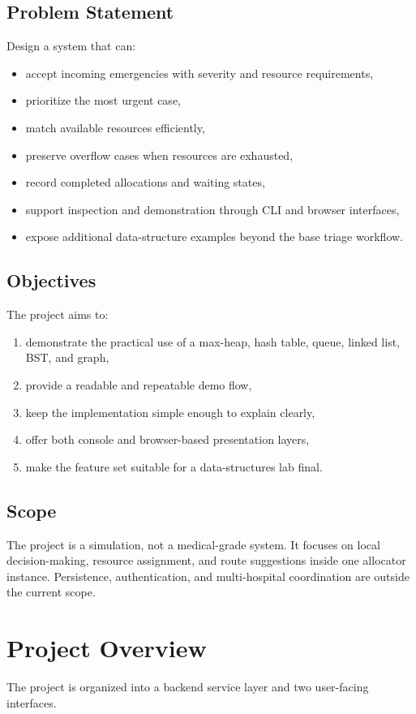 \documentclass[12pt,a4paper]{report}
\begin{document}
\section{Problem Statement}
Design a system that can:
\begin{itemize}[leftmargin=1.2cm]
  \item accept incoming emergencies with severity and resource requirements,
  \item prioritize the most urgent case,
  \item match available resources efficiently,
  \item preserve overflow cases when resources are exhausted,
  \item record completed allocations and waiting states,
  \item support inspection and demonstration through CLI and browser interfaces,
  \item expose additional data-structure examples beyond the base triage workflow.
\end{itemize}

\section{Objectives}
The project aims to:
\begin{enumerate}[leftmargin=1.2cm]
  \item demonstrate the practical use of a max-heap, hash table, queue, linked list, BST, and graph,
  \item provide a readable and repeatable demo flow,
  \item keep the implementation simple enough to explain clearly,
  \item offer both console and browser-based presentation layers,
  \item make the feature set suitable for a data-structures lab final.
\end{enumerate}

\section{Scope}
The project is a simulation, not a medical-grade system. It focuses on local decision-making, resource assignment, and route suggestions inside one allocator instance. Persistence, authentication, and multi-hospital coordination are outside the current scope.

\chapter{Project Overview}
The project is organized into a backend service layer and two user-facing interfaces.
\end{document}
